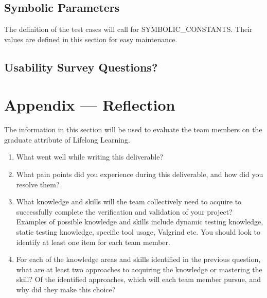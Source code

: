 \documentclass[12pt, titlepage]{article}
\begin{document}
\subsection{Symbolic Parameters}

The definition of the test cases will call for SYMBOLIC\_CONSTANTS.
Their values are defined in this section for easy maintenance.

\subsection{Usability Survey Questions?}


\newpage{}
\section*{Appendix --- Reflection}


The information in this section will be used to evaluate the team members on the
graduate attribute of Lifelong Learning.



\begin{enumerate}
  \item What went well while writing this deliverable?
  \item What pain points did you experience during this deliverable, and how
    did you resolve them?
  \item What knowledge and skills will the team collectively need to acquire to
    successfully complete the verification and validation of your project?
    Examples of possible knowledge and skills include dynamic testing knowledge,
    static testing knowledge, specific tool usage, Valgrind etc.  You
    should look to
    identify at least one item for each team member.
  \item For each of the knowledge areas and skills identified in the previous
    question, what are at least two approaches to acquiring the knowledge or
    mastering the skill?  Of the identified approaches, which will each team
    member pursue, and why did they make this choice?
\end{enumerate}
\end{document}
